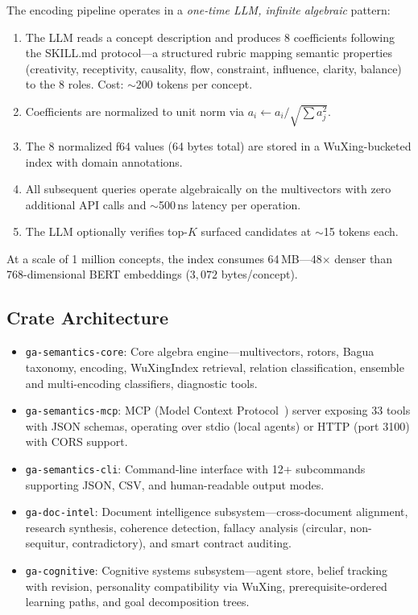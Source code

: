 \documentclass[11pt,a4paper]{article}
\begin{document}
The encoding pipeline operates in a \emph{one-time LLM, infinite algebraic}
pattern:

\begin{enumerate}[nosep]
\item The LLM reads a concept description and produces 8 coefficients following
  the SKILL.md protocol---a structured rubric mapping semantic properties
  (creativity, receptivity, causality, flow, constraint, influence, clarity,
  balance) to the 8 roles. Cost: $\sim$200 tokens per concept.
\item Coefficients are normalized to unit norm via $a_i \leftarrow a_i / \sqrt{\sum a_j^2}$.
\item The 8 normalized f64 values (64 bytes total) are stored in a
  WuXing-bucketed index with domain annotations.
\item All subsequent queries operate algebraically on the multivectors with
  zero additional API calls and $\sim$500\,ns latency per operation.
\item The LLM optionally verifies top-$K$ surfaced candidates at
  $\sim$15 tokens each.
\end{enumerate}

At a scale of 1 million concepts, the index consumes 64\,MB---48$\times$
denser than 768-dimensional BERT embeddings ($3{,}072$ bytes/concept).

\subsection{Crate Architecture}

\begin{itemize}[nosep]
\item \texttt{ga-semantics-core}: Core algebra engine---multivectors, rotors,
  Bagua taxonomy, encoding, WuXingIndex retrieval, relation classification,
  ensemble and multi-encoding classifiers, diagnostic tools.
\item \texttt{ga-semantics-mcp}: MCP (Model Context
  Protocol~\cite{mcp2024}) server exposing 33 tools with JSON schemas, operating
  over stdio (local agents) or HTTP (port 3100) with CORS support.
\item \texttt{ga-semantics-cli}: Command-line interface with 12+ subcommands
  supporting JSON, CSV, and human-readable output modes.
\item \texttt{ga-doc-intel}: Document intelligence subsystem---cross-document
  alignment, research synthesis, coherence detection, fallacy analysis
  (circular, non-sequitur, contradictory), and smart contract auditing.
\item \texttt{ga-cognitive}: Cognitive systems subsystem---agent store,
  belief tracking with revision, personality compatibility via WuXing,
  prerequisite-ordered learning paths, and goal decomposition trees.
\end{itemize}
\end{document}
